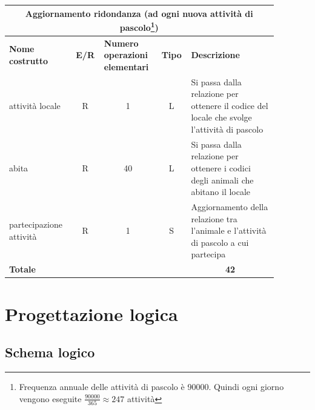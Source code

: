 \documentclass[12pt,a4paper]{article}
\begin{document}
\begin{center}\setlength{\extrarowheight}{1.5pt}\begin{longtable}{|p{0.2\linewidth}|p{0.1\linewidth}|p{0.175\linewidth}|p{0.1\linewidth}|p{0.3\linewidth}|}
\hline
\multicolumn{5}{|c|}{Aggiornamento ridondanza (ad ogni nuova attività di pascolo\footnote{Frequenza annuale delle attività di pascolo è 90000. Quindi ogni giorno vengono eseguite $\frac{90000}{365}\approx 247$ attività})}
\\
\hline \textbf{Nome costrutto}   & \multicolumn{1}{|c|}{\textbf{E/R}} & \textbf{Numero operazioni elementari} & \multicolumn{1}{|c|}{\textbf{Tipo}} & \textbf{Descrizione}\\ 

\hline
attività locale
 & 
\multicolumn{1}{|c|}{R}
 & 
\multicolumn{1}{|c|}{1}
 & 
\multicolumn{1}{|c|}{L}
 & 
Si passa dalla relazione per ottenere il codice del locale che svolge l'attività di pascolo
\\
\hline
abita
 & 
\multicolumn{1}{|c|}{R}
 & 
\multicolumn{1}{|c|}{40}
 & 
\multicolumn{1}{|c|}{L}
 & 
Si passa dalla relazione per ottenere i codici degli animali che abitano il locale
\\
\hline
partecipazione attività
 & 
\multicolumn{1}{|c|}{R}
 & 
\multicolumn{1}{|c|}{1}
 & 
\multicolumn{1}{|c|}{S}
 & 
Aggiornamento della relazione tra l'animale e l'attività di pascolo a cui partecipa
\\
\hline
\multicolumn{4}{|l|}{\textbf{Totale}}
 & 
\multicolumn{1}{|c|}{\textbf{42}}
\\
\hline
\end{longtable}\end{center}







\section{Progettazione logica}

\subsection{Schema logico}
\end{document}
